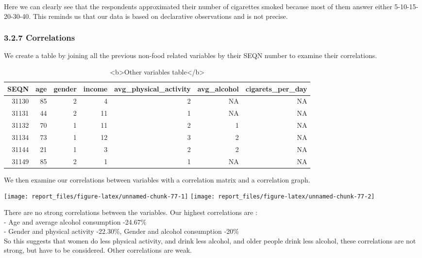 \documentclass[
]{article}
\begin{document}
Here we can clearly see that the respondents approximated their number
of cigarettes smoked because most of them answer either
5-10-15-20-30-40. This reminds us that our data is based on declarative
observations and is not precise.

\hypertarget{correlations-1}{%
\subsubsection{3.2.7 Correlations}\label{correlations-1}}

We create a table by joining all the previous non-food related variables
by their SEQN number to examine their correlations.

\begin{table}

\caption{\label{tab:unnamed-chunk-76}<b>Other variables table</b>}
\centering
\begin{tabular}[t]{r|r|r|r|r|r|r}
\hline
SEQN & age & gender & income & avg\_physical\_activity & avg\_alcohol & cigarets\_per\_day\\
\hline
31130 & 85 & 2 & 4 & 2 & NA & NA\\
\hline
31131 & 44 & 2 & 11 & 1 & NA & NA\\
\hline
31132 & 70 & 1 & 11 & 2 & 1 & NA\\
\hline
31134 & 73 & 1 & 12 & 3 & 2 & NA\\
\hline
31144 & 21 & 1 & 3 & 2 & 2 & NA\\
\hline
31149 & 85 & 2 & 1 & 1 & NA & NA\\
\hline
\end{tabular}
\end{table}

We then examine our correlations between variables with a correlation
matrix and a correlation graph.

\begin{center}\texttt{[image: report\_files/figure-latex/unnamed-chunk-77-1]} \texttt{[image: report\_files/figure-latex/unnamed-chunk-77-2]} \end{center}

There are no strong correlations between the variables. Our highest
correlations are :\\
- Age and average alcohol consumption -24.67\%\\
- Gender and physical activity -22.30\%, Gender and alcohol consumption
-20\%\\
So this suggests that women do less physical activity, and drink less
alcohol, and older people drink less alcohol, these correlations are not
strong, but have to be considered. Other correlations are weak.
\end{document}
